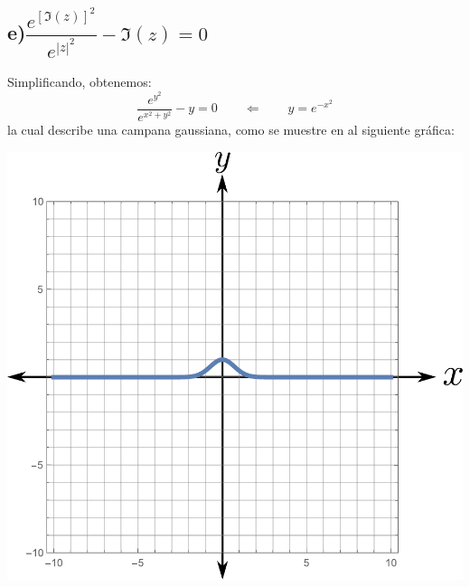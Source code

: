 \documentclass{article}
\begin{document}
\subsection*{e)$\dfrac{e^{[\Im(z)]^2}}{e^{|z|^2}}-\Im(z)=0 $}
Simplificando, obtenemos:
$$\dfrac{e^{y^2}}{e^{x^2+y^2}}-y=0 \qquad\Leftarrow\qquad y=e^{-x^2}$$
la cual describe una campana gaussiana, como se muestre en al siguiente gráfica:
\begin{center}
\includegraphics[scale=0.5]{fig6.pdf}
\end{center}
\end{document}
